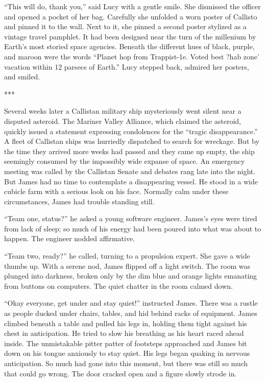 \documentclass[12pt]{article} %
\begin{document}
``This will do, thank you,'' said Lucy with a gentle smile. She dismissed the officer and opened a pocket of her bag. Carefully she unfolded a worn poster of Callisto and pinned it to the wall. Next to it, she pinned a second poster stylized as a vintage travel pamphlet. It had been designed near the turn of the millenium by Earth's most storied space agencies. Beneath the different hues of black, purple, and maroon were the words ``Planet hop from Trappist-1e. Voted best ?hab zone' vacation within 12 parsecs of Earth.'' Lucy stepped back, admired her posters, and smiled.

***

Several weeks later a Callistan military ship mysteriously went silent near a disputed asteroid. The Mariner Valley Alliance, which claimed the asteroid, quickly issued a statement expressing condolences for the ``tragic disappearance.'' A fleet of Callistan ships was hurriedly dispatched to search for wreckage. But by the time they arrived more weeks had passed and they came up empty, the ship seemingly consumed by the impossibly wide expanse of space. An emergency meeting was called by the Callistan Senate and debates rang late into the night. But James had no time to contemplate a disappearing vessel. He stood in a wide cubicle farm with a serious look on his face. Normally calm under these circumstances, James had trouble standing still.

``Team one, status?'' he asked a young software engineer. James's eyes were tired from lack of sleep; so much of his energy had been poured into what was about to happen. The engineer nodded affirmative.

``Team two, ready?'' he called, turning to a propulsion expert. She gave a wide thumbs up. With a serene nod, James flipped off a light switch. The room was plunged into darkness, broken only by the dim blue and orange lights emanating from buttons on computers. The quiet chatter in the room calmed down.

``Okay everyone, get under and stay quiet!'' instructed James. There was a rustle as people ducked under chairs, tables, and hid behind racks of equipment. James climbed beneath a table and pulled his legs in, holding them tight against his chest in anticipation. He tried to slow his breathing as his heart raced ahead inside. The unmistakable pitter patter of footsteps approached and James bit down on his tongue anxiously to stay quiet. His legs began quaking in nervous anticipation. So much had gone into this moment, but there was still so much that could go wrong. The door cracked open and a figure slowly strode in.
\end{document}

